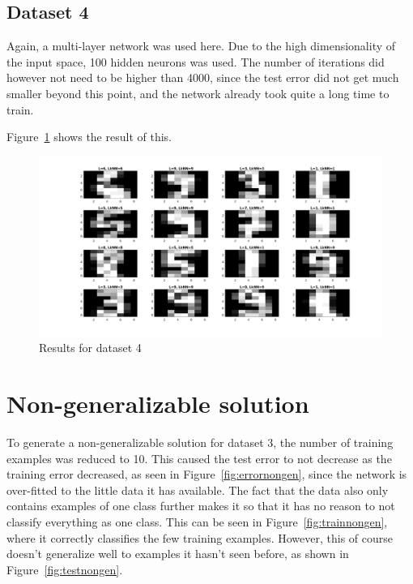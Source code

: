 \documentclass{article}
\begin{document}
\subsection{Dataset 4}

Again, a multi-layer network was used here. Due to the high dimensionality of
the input space, 100 hidden neurons was used. The number of
iterations did however not need to be higher than 4000, since the test error
did not get much smaller beyond this point, and the network already took quite
a long time to train.

Figure~\ref{fig:res4} shows the result of this.

\begin{figure}[h!]
    \includegraphics[width=13cm]{dataset4res.png}
    \caption{Results for dataset 4}
    \label{fig:res4}
\end{figure}

\section{Non-generalizable solution}

To generate a non-generalizable solution for dataset 3, the number of training
examples was reduced to 10. This caused the test error to not decrease as the
training error decreased, as seen in Figure~\ref{fig:errornongen}, since the
network is over-fitted to the little data it has available. The fact that the
data also only contains examples of one class further makes it so that it has
no reason to not classify everything as one class. This can be seen in 
Figure~\ref{fig:trainnongen}, where it correctly classifies the few training
examples. However, this of course doesn't generalize well to examples it hasn't
seen before, as shown in Figure~\ref{fig:testnongen}.
\end{document}
